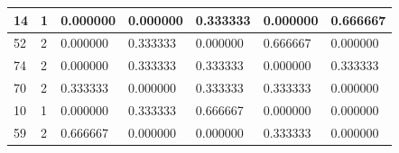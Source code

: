 \documentclass[materials,article,submit,pdftex,moreauthors]{Definitions/mdpi}
\begin{document}
\begin{table}[H]
\begin{scriptsize}
\begin{minipage}{0.40\linewidth}
{\begin{tabularx}{\linewidth}{@{} |l|l|l|l|l|l|l|}
        14 & 1 & 0.000000 & 0.000000 & 0.333333 & 0.000000 & 0.666667 \\ \hline
        52 & 2 & 0.000000 & 0.333333 & 0.000000 & 0.666667 & 0.000000 \\ \hline
        74 & 2 & 0.000000 & 0.333333 & 0.333333 & 0.000000 & 0.333333 \\ \hline
        70 & 2 & 0.333333 & 0.000000 & 0.333333 & 0.333333 & 0.000000 \\ \hline
        10 & 1 & 0.000000 & 0.333333 & 0.666667 & 0.000000 & 0.000000 \\ \hline
        59 & 2 & 0.666667 & 0.000000 & 0.000000 & 0.333333 & 0.000000 \\ \hline
\bottomrule
\end{tabularx}
}
\end{minipage}
\end{scriptsize}
\end{table}

{}


\nocite{*}
\end{document}
